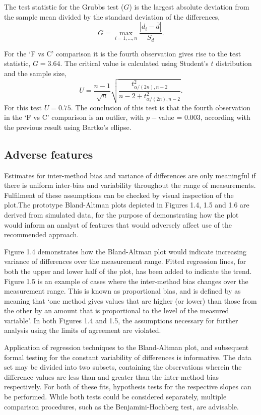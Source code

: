 \documentclass[Main.tex]{subfiles}
\begin{document}
	The test statistic for the Grubbs test ($G$) is the largest
	absolute deviation from the sample mean divided by the standard
	deviation of the differences,
	\[
	G =  \displaystyle\max_{i=1,\ldots, n}\frac{\left \vert d_i -
		\bar{d}\right\vert}{S_{d}}.
	\]
	
	For the `F vs C' comparison it is the fourth observation gives
	rise to the test statistic, $G = 3.64$. The critical value is
	calculated using Student's $t$ distribution and the sample size,
	\[
	U = \frac{n-1}{\sqrt{n}} \sqrt{\frac{t_{\alpha/(2n),n-2}^2}{n - 2
			+ t_{\alpha/(2n),n-2}^2}}.
	\]
	For this test $U = 0.75$. The conclusion of this test is that the fourth observation in the `F vs C' comparison is an outlier, with $p-$value = 0.003, according with the previous result using Bartko's ellipse.
	
	\newpage
	
	

	\subsection{Adverse features}
	
	Estimates for inter-method bias and variance of differences are only meaningful if there is uniform inter-bias and variability throughout the range of measurements. Fulfilment of these assumptions can be checked by visual inspection of the plot.The prototype Bland-Altman plots depicted in Figures 1.4, 1.5 and 1.6 are derived from simulated data, for the purpose of demonstrating how the plot would inform an analyst of features that would adversely affect use of the recommended approach.
	
	Figure 1.4 demonstrates how the Bland-Altman plot would indicate
	increasing variance of differences over the measurement range.
	Fitted regression lines, for both the upper and lower half of the
	plot, has been added to indicate the trend. Figure 1.5 is an
	example of cases where the inter-method bias changes over the
	measurement range. This is known as proportional bias, and is
	defined by \citet{ludbrook97} as meaning that `one method gives
	values that are higher (or lower) than those from the other by an
	amount that is proportional to the level of the measured
	variable'. In both Figures 1.4 and 1.5, the assumptions necessary
	for further analysis using the limits of agreement are violated.
	
	Application of regression techniques to the Bland-Altman plot, and
	subsequent formal testing for the constant variability of
	differences is informative. The data set may be divided into two
	subsets, containing the observations wherein the difference values
	are less than and greater than the inter-method bias respectively.
	For both of these fits, hypothesis tests for the respective slopes
	can be performed. While both tests could be considered separately,
	multiple comparison procedures, such as the Benjamini-Hochberg
	\citep{BH} test, are advisable.
	
\end{document}
